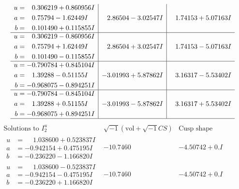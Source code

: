 \documentclass[1p]{elsarticle_modified}
\theoremstyle{definition}
\newcommand{\I}{\sqrt{-1}}
\begin{document}
$$\begin{array}{c|c|c}
\begin{aligned}
u &= \phantom{-}0.306219 + 0.860956 I \\
a &= \phantom{-}0.75794 - 1.62449 I \\
b &= \phantom{-}0.101490 + 0.115855 I\end{aligned}
 & \phantom{-}2.86504 - 3.02547 I & \phantom{-}1.74153 + 5.07163 I \\ \hline\begin{aligned}
u &= \phantom{-}0.306219 - 0.860956 I \\
a &= \phantom{-}0.75794 + 1.62449 I \\
b &= \phantom{-}0.101490 - 0.115855 I\end{aligned}
 & \phantom{-}2.86504 + 3.02547 I & \phantom{-}1.74153 - 5.07163 I \\ \hline\begin{aligned}
u &= -0.790784 + 0.845104 I \\
a &= \phantom{-}1.39288 - 0.51155 I \\
b &= -0.968075 - 0.894251 I\end{aligned}
 & -3.01993 + 5.87862 I & \phantom{-}3.16317 - 5.53402 I \\ \hline\begin{aligned}
u &= -0.790784 - 0.845104 I \\
a &= \phantom{-}1.39288 + 0.51155 I \\
b &= -0.968075 + 0.894251 I\end{aligned}
 & -3.01993 - 5.87862 I & \phantom{-}3.16317 + 5.53402 I\\
 \hline 
 \end{array}$$\newpage$$\begin{array}{c|c|c}  
\text{Solutions to }I^u_{2}& \I (\text{vol} + \sqrt{-1}CS) & \text{Cusp shape}\\
 \hline 
\begin{aligned}
u &= \phantom{-}1.038600 + 0.523837 I \\
a &= -0.942154 + 0.475195 I \\
b &= -0.236220 - 1.166820 I\end{aligned}
 & -10.7460\phantom{ +0.000000I} & -4.50742 + 0. I\phantom{ +0.000000I} \\ \hline\begin{aligned}
u &= \phantom{-}1.038600 - 0.523837 I \\
a &= -0.942154 - 0.475195 I \\
b &= -0.236220 + 1.166820 I\end{aligned}
 & -10.7460\phantom{ +0.000000I} & -4.50742 + 0. I\phantom{ +0.000000I} \\ \hline\begin{aligned}

\end{aligned}
\end{array}$$
\end{document}
